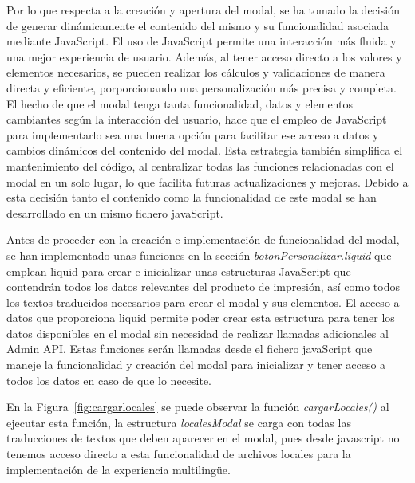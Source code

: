 \documentclass[12pt]{article}
\begin{document}
Por lo que respecta a la creación y apertura del modal, se ha tomado la decisión de generar dinámicamente el contenido del mismo y su funcionalidad
asociada mediante JavaScript. El uso de JavaScript permite una interacción más fluida y una mejor experiencia de usuario. Además, al tener acceso directo 
a los valores y elementos necesarios, se pueden realizar los cálculos y validaciones de manera directa y eficiente, porporcionando una personalización
más precisa y completa. El hecho de que el modal tenga tanta funcionalidad, datos y elementos cambiantes según la interacción del usuario, hace que 
el empleo de JavaScript para implementarlo sea una buena opción para facilitar ese acceso a datos y cambios dinámicos del contenido del modal.
Esta estrategia también simplifica el mantenimiento del código, al centralizar todas las funciones relacionadas con el modal en un solo lugar, lo que facilita
futuras actualizaciones y mejoras. Debido a esta decisión tanto el contenido como la funcionalidad de este modal se han desarrollado en un mismo fichero javaScript.

Antes de proceder con la creación e implementación de funcionalidad del modal, se han implementado unas funciones en la sección \textit{botonPersonalizar.liquid} que emplean liquid para crear e inicializar unas estructuras JavaScript que 
contendrán todos los datos relevantes del producto de impresión, así como todos los textos traducidos necesarios para crear el modal y sus elementos. El acceso a datos que proporciona liquid permite poder crear 
esta estructura para tener los datos disponibles en el modal sin necesidad de realizar llamadas adicionales al Admin API. Estas funciones serán llamadas desde el fichero 
javaScript que maneje la funcionalidad y creación del modal para inicializar y tener acceso a todos los datos en caso de que lo necesite.

En la Figura~\ref{fig:cargarlocales} se puede observar la función \textit{cargarLocales()} al ejecutar esta función, la estructura \textit{localesModal} se carga con 
todas las traducciones de textos que deben aparecer en el modal, pues desde javascript no tenemos acceso directo a esta funcionalidad de archivos locales para la implementación 
de la experiencia multilingüe.
\end{document}
